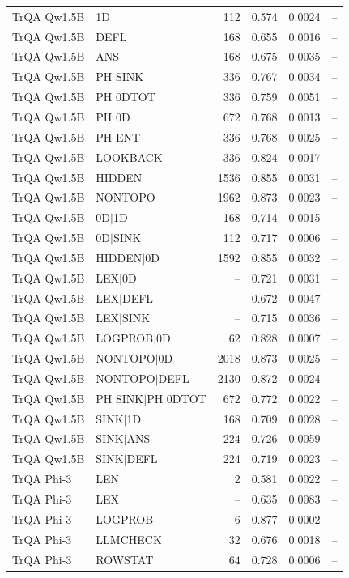 \begin{longtable}{llrrrr}
TrQA Qw1.5B & 1D & 112 & 0.574 & 0.0024 & -- \\
TrQA Qw1.5B & DEFL & 168 & 0.655 & 0.0016 & -- \\
TrQA Qw1.5B & ANS & 168 & 0.675 & 0.0035 & -- \\
TrQA Qw1.5B & PH SINK & 336 & 0.767 & 0.0034 & -- \\
TrQA Qw1.5B & PH 0DTOT & 336 & 0.759 & 0.0051 & -- \\
TrQA Qw1.5B & PH 0D & 672 & 0.768 & 0.0013 & -- \\
TrQA Qw1.5B & PH ENT & 336 & 0.768 & 0.0025 & -- \\
TrQA Qw1.5B & LOOKBACK & 336 & 0.824 & 0.0017 & -- \\
TrQA Qw1.5B & HIDDEN & 1536 & 0.855 & 0.0031 & -- \\
TrQA Qw1.5B & NONTOPO & 1962 & 0.873 & 0.0023 & -- \\
TrQA Qw1.5B & 0D$\mid$1D & 168 & 0.714 & 0.0015 & -- \\
TrQA Qw1.5B & 0D$\mid$SINK & 112 & 0.717 & 0.0006 & -- \\
TrQA Qw1.5B & HIDDEN$\mid$0D & 1592 & 0.855 & 0.0032 & -- \\
TrQA Qw1.5B & LEX$\mid$0D & -- & 0.721 & 0.0031 & -- \\
TrQA Qw1.5B & LEX$\mid$DEFL & -- & 0.672 & 0.0047 & -- \\
TrQA Qw1.5B & LEX$\mid$SINK & -- & 0.715 & 0.0036 & -- \\
TrQA Qw1.5B & LOGPROB$\mid$0D & 62 & 0.828 & 0.0007 & -- \\
TrQA Qw1.5B & NONTOPO$\mid$0D & 2018 & 0.873 & 0.0025 & -- \\
TrQA Qw1.5B & NONTOPO$\mid$DEFL & 2130 & 0.872 & 0.0024 & -- \\
TrQA Qw1.5B & PH SINK$\mid$PH 0DTOT & 672 & 0.772 & 0.0022 & -- \\
TrQA Qw1.5B & SINK$\mid$1D & 168 & 0.709 & 0.0028 & -- \\
TrQA Qw1.5B & SINK$\mid$ANS & 224 & 0.726 & 0.0059 & -- \\
TrQA Qw1.5B & SINK$\mid$DEFL & 224 & 0.719 & 0.0023 & -- \\
TrQA Phi-3 & LEN & 2 & 0.581 & 0.0022 & -- \\
TrQA Phi-3 & LEX & -- & 0.635 & 0.0083 & -- \\
TrQA Phi-3 & LOGPROB & 6 & 0.877 & 0.0002 & -- \\
TrQA Phi-3 & LLMCHECK & 32 & 0.676 & 0.0018 & -- \\
TrQA Phi-3 & ROWSTAT & 64 & 0.728 & 0.0006 & -- \\

\end{longtable}

